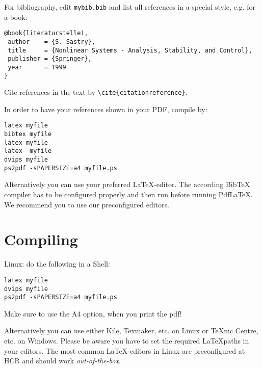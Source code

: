 For bibliography, edit {\tt mybib.bib} and list all
references in a special style, e.g. for a book:
\begin{verbatim}
@book{literaturstelle1,
 author    = {S. Sastry},
 title     = {Nonlinear Systems - Analysis, Stability, and Control},
 publisher = {Springer},
 year      = 1999
}
\end{verbatim}

Cite references in the text by \verb|\cite{citationreference}|.

In order to have your references shown in your PDF, compile by:

\begin{verbatim}
latex myfile
bibtex myfile
latex myfile
latex  myfile
dvips myfile
ps2pdf -sPAPERSIZE=a4 myfile.ps
\end{verbatim}

Alternatively you can use your preferred \LaTeX -editor. The according BibTeX compiler has to be configured properly and then run before running PdfLaTeX. We recommend you to use our preconfigured editors.

\section{Compiling}
Linux:
do the following in a Shell:\\
\begin{verbatim}
latex myfile
dvips myfile
ps2pdf -sPAPERSIZE=a4 myfile.ps
\end{verbatim}
Make sure to use the A4 option, when you print the pdf!

Alternatively you can use either Kile, Texmaker, etc. on Linux or TeXnic Centre, etc. on Windows. Please be aware you have to set the required \LaTeX paths in your editors. The most common \LaTeX -editors in Linux are preconfigured at HCR and should work \emph{out-of-the-box}.




